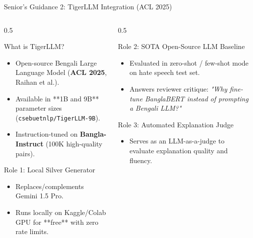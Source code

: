 \documentclass[10pt, aspectratio=169]{beamer}
\begin{document}
\begin{frame}{Senior's Guidance 2: TigerLLM Integration (ACL 2025)}
    \begin{columns}
        \begin{column}{0.5\textwidth}
            \begin{block}{What is TigerLLM?}
                \begin{itemize}
                    \item Open-source Bengali Large Language Model (\textbf{ACL 2025}, Raihan et al.).
                    \item Available in **1B and 9B** parameter sizes (\texttt{csebuetnlp/TigerLLM-9B}).
                    \item Instruction-tuned on \textbf{Bangla-Instruct} (100K high-quality pairs).
                \end{itemize}
            \end{block}

            \begin{block}{Role 1: Local Silver Generator}
                \begin{itemize}
                    \item Replaces/complements Gemini 1.5 Pro.
                    \item Runs locally on Kaggle/Colab GPU for **free** with zero rate limits.
                \end{itemize}
            \end{block}
        \end{column}

        \begin{column}{0.5\textwidth}
            \begin{block}{Role 2: SOTA Open-Source LLM Baseline}
                \begin{itemize}
                    \item Evaluated in zero-shot / few-shot mode on hate speech test set.
                    \item Answers reviewer critique: \textit{"Why fine-tune BanglaBERT instead of prompting a Bengali LLM?"}
                \end{itemize}
            \end{block}

            \begin{block}{Role 3: Automated Explanation Judge}
                \begin{itemize}
                    \item Serves as an LLM-as-a-judge to evaluate explanation quality and fluency.
                \end{itemize}
            \end{block}
        \end{column}
    \end{columns}
\end{frame}
\end{document}
